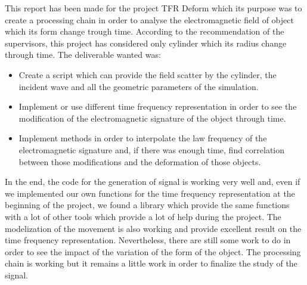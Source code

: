 This report has been made for the project TFR Deform which its purpose was to create a processing chain in order to analyse the electromagnetic field of object which its form change trough time. According to the recommendation of the supervisors, this project has considered only cylinder which its radius change through time. The deliverable wanted was:

\medskip

\begin{itemize}
\item Create a script which can provide the field scatter by the cylinder, the incident wave and all the geometric parameters of the simulation.
\item Implement or use different time frequency representation in order to see the modification of the electromagnetic signature of the object through time.
\item Implement methods in order to interpolate the law frequency of the electromagnetic signature and, if there was enough time, find correlation between those modifications and the deformation of those objects.
\end{itemize}

\medskip

In the end, the code for the generation of signal is working very well and, even if we implemented our own functions for the time frequency representation at the beginning of the project, we found a library which provide the same functions with a lot of other tools which provide a lot of help during the project. The modelization of the movement is also working and provide excellent result on the time frequency representation. Nevertheless, there are still some work to do in order to see the impact of the variation of the form of the object. The processing chain is working but it remains a little work in order to finalize the study of the signal.
